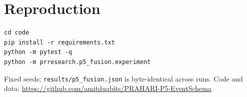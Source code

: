 \documentclass[11pt,a4paper]{article}
\begin{document}
\section*{Reproduction}

\begin{verbatim}
cd code
pip install -r requirements.txt
python -m pytest -q
python -m prresearch.p5_fusion.experiment
\end{verbatim}

Fixed seeds; \texttt{results/p5\_fusion.json} is byte-identical across runs.
Code and data: \url{https://github.com/amitduabits/PRAHARI-P5-EventSchema}



\end{document}
